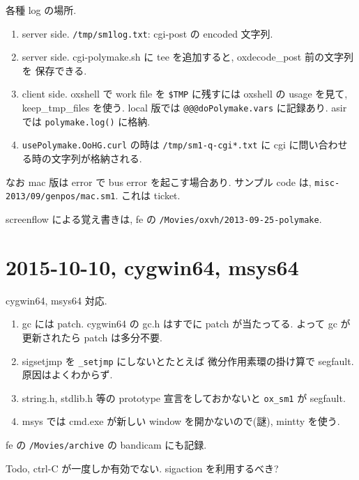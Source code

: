 \documentclass{jarticle}
\begin{document}
各種 log の場所.
\begin{enumerate}
\item server side. {\tt /tmp/sm1log.txt}: cgi-post の encoded 文字列.
\item server side.  cgi-polymake.sh に tee を追加すると, oxdecode\_post 前の文字列を
保存できる.
\item client side. oxshell で work file を {\tt \$TMP} に残すには
oxshell の usage を見て, keep\_tmp\_files を使う.
local 版では {\tt @@@doPolymake.vars} に記録あり.
asir では {\tt polymake.log()} に格納.
\item {\tt usePolymake.OoHG.curl} の時は {\tt /tmp/sm1-q-cgi*.txt}
に cgi に問い合わせる時の文字列が格納される.
\end{enumerate}

なお mac 版は error で bus error を起こす場合あり. 
サンプル code は, {\tt misc-2013/09/genpos/mac.sm1}. 
これは ticket.

screenflow による覚え書きは,
fe の {\tt /Movies/oxvh/2013-09-25-polymake}.

\section{2015-10-10, cygwin64, msys64}

cygwin64, msys64 対応.
\begin{enumerate}
\item gc には patch. cygwin64 の gc.h はすでに patch が当たってる.
  よって gc が更新されたら patch は多分不要.
\item sigsetjmp を {\tt \_setjmp} にしないとたとえば
微分作用素環の掛け算で segfault.  原因はよくわからず.
\item string.h, stdlib.h 等の prototype 宣言をしておかないと {\tt ox\_sm1} が segfault.
\item msys では cmd.exe が新しい window を開かないので(謎), mintty を使う.
\end{enumerate}
fe の {\tt /Movies/archive} の bandicam にも記録.

Todo, ctrl-C が一度しか有効でない. sigaction を利用するべき?
\end{document}
